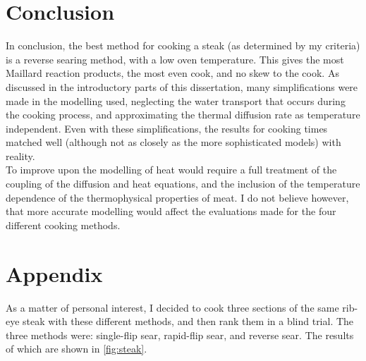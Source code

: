 \documentclass[11pt]{article}
\begin{document}
	\section{Conclusion}
	
	In conclusion, the best method for cooking a steak (as determined by my criteria) is a reverse searing method, with a low oven temperature. This gives the most Maillard reaction products, the most even cook, and no skew to the cook. As discussed in the introductory parts of this dissertation, many simplifications were made in the modelling used, neglecting the water transport that occurs during the cooking process, and approximating the thermal diffusion rate as temperature independent. Even with these simplifications, the results for cooking times matched well (although not as closely as the more sophisticated models\cite{steak_modelling}) with reality. \\
	
	To improve upon the modelling of heat would require a full treatment of the coupling of the diffusion and heat equations, and the inclusion of the temperature dependence of the thermophysical properties of meat. I do not believe however, that more accurate modelling would affect the evaluations made for the four different cooking methods.
	
	\pagebreak
	
	\small
	
	 
	
	\pagebreak 
	
	\section*{Appendix}
	
	As a matter of personal interest, I decided to cook three sections of the same rib-eye steak with these different methods, and then rank them in a blind trial. The three methods were: single-flip sear, rapid-flip sear, and reverse sear. The results of which are shown in \autoref{fig:steak}.
	
\end{document}
